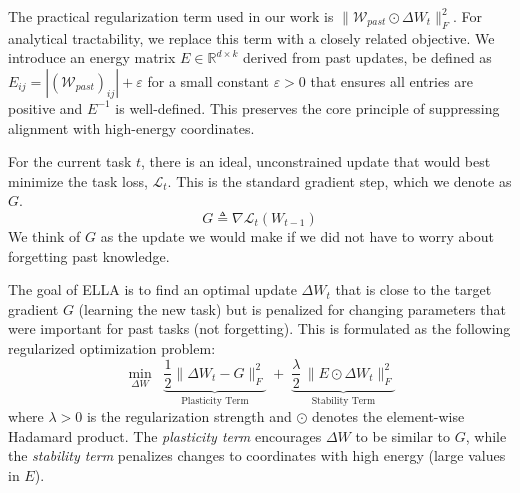 The practical regularization term used in our work is $\|\mathcal{W}_{past} \odot \Delta W_t\|_F^2$. For analytical tractability, we replace this term with a closely related objective. We introduce an energy matrix $E \in \mathbb{R}^{d \times k}$ derived from past updates, be defined as $E_{ij} = |(\mathcal{W}_{past})_{ij}| + \varepsilon$ for a small constant $\varepsilon > 0$ that ensures all entries are positive and $E^{-1}$ is well-defined. This preserves the core principle of suppressing alignment with high-energy coordinates.

For the current task $t$, there is an ideal, unconstrained update that would best minimize the task loss, $\mathcal{L}_t$. This is the standard gradient step, which we denote as $G$.
\[
G \triangleq \nabla \mathcal{L}_t(W_{t-1})
\]
We think of $G$ as the update we would make if we did not have to worry about forgetting past knowledge.

The goal of ELLA is to find an optimal update $\Delta W_t$ that is close to the target gradient $G$ (learning the new task) but is penalized for changing parameters that were important for past tasks (not forgetting). This is formulated as the following regularized optimization problem:
\begin{equation}
\label{eq:ella-prob}
\min_{\Delta W}\;\; \underbrace{\frac{1}{2}\|\Delta W_t - G\|_F^2}_{\text{Plasticity Term}} \;+\; \underbrace{\frac{\lambda}{2}\,\|E\odot \Delta W_t\|_F^2}_{\text{Stability Term}}
\end{equation}
where $\lambda > 0$ is the regularization strength and $\odot$ denotes the element-wise Hadamard product. The \textit{plasticity term} encourages $\Delta W$ to be similar to $G$, while the \textit{stability term} penalizes changes to coordinates with high energy (large values in $E$).



